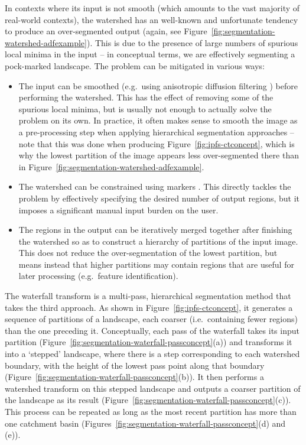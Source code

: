 \documentclass[a4paper]{article}
\begin{document}
In contexts where its input is not smooth (which amounts to the vast majority of real-world contexts), the watershed has an well-known and unfortunate tendency to produce an over-segmented output (again, see Figure~\ref{fig:segmentation-watershed-adfexample}). This is due to the presence of large numbers of spurious local minima in the input -- in conceptual terms, we are effectively segmenting a pock-marked landscape. The problem can be mitigated in various ways:
%
\begin{itemize}

\item The input can be smoothed (e.g.~using anisotropic diffusion filtering \cite{perona90}) before performing the watershed. This has the effect of removing some of the spurious local minima, but is usually not enough to actually solve the problem on its own. In practice, it often makes sense to smooth the image as a pre-processing step when applying hierarchical segmentation approaches -- note that this was done when producing Figure~\ref{fig:ipfs-ctconcept}, which is why the lowest partition of the image appears less over-segmented there than in Figure~\ref{fig:segmentation-watershed-adfexample}.

\item The watershed can be constrained using markers \cite{meyer90}. This directly tackles the problem by effectively specifying the desired number of output regions, but it imposes a significant manual input burden on the user.

\item The regions in the output can be iteratively merged together after finishing the watershed so as to construct a hierarchy of partitions of the input image. This does not reduce the over-segmentation of the lowest partition, but means instead that higher partitions may contain regions that are useful for later processing (e.g.~feature identification).

\end{itemize}
%
The waterfall transform is a multi-pass, hierarchical segmentation method that takes the third approach. As shown in Figure~\ref{fig:ipfs-ctconcept}, it generates a sequence of partitions of a landscape, each coarser (i.e.~containing fewer regions) than the one preceding it. Conceptually, each pass of the waterfall takes its input partition (Figure~\ref{fig:segmentation-waterfall-passconcept}(a)) and transforms it into a `stepped' landscape, where there is a step corresponding to each watershed boundary, with the height of the lowest pass point along that boundary (Figure~\ref{fig:segmentation-waterfall-passconcept}(b)). It then performs a watershed transform on this stepped landscape and outputs a coarser partition of the landscape as its result (Figure~\ref{fig:segmentation-waterfall-passconcept}(c)). This process can be repeated as long as the most recent partition has more than one catchment basin (Figures~\ref{fig:segmentation-waterfall-passconcept}(d) and (e)).
\end{document}
